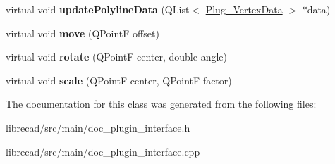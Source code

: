 \begin{DoxyCompactItemize}
\item 
\hypertarget{classPlugin__Entity_a1ce729b58109a3a43339f5902d992484}{virtual void {\bfseries update\-Polyline\-Data} (Q\-List$<$ \hyperlink{classPlug__VertexData}{Plug\-\_\-\-Vertex\-Data} $>$ $\ast$data)}\label{classPlugin__Entity_a1ce729b58109a3a43339f5902d992484}

\item 
\hypertarget{classPlugin__Entity_a318ee7846a32ee0a449817018d6be71c}{virtual void {\bfseries move} (Q\-Point\-F offset)}\label{classPlugin__Entity_a318ee7846a32ee0a449817018d6be71c}

\item 
\hypertarget{classPlugin__Entity_a1e082a0ce29a909cf0019939909fb670}{virtual void {\bfseries rotate} (Q\-Point\-F center, double angle)}\label{classPlugin__Entity_a1e082a0ce29a909cf0019939909fb670}

\item 
\hypertarget{classPlugin__Entity_ab9f72beb7eb032ae97b571226ecad1e7}{virtual void {\bfseries scale} (Q\-Point\-F center, Q\-Point\-F factor)}\label{classPlugin__Entity_ab9f72beb7eb032ae97b571226ecad1e7}

\end{DoxyCompactItemize}


The documentation for this class was generated from the following files\-:\begin{DoxyCompactItemize}
\item 
librecad/src/main/doc\-\_\-plugin\-\_\-interface.\-h\item 
librecad/src/main/doc\-\_\-plugin\-\_\-interface.\-cpp\end{DoxyCompactItemize}
